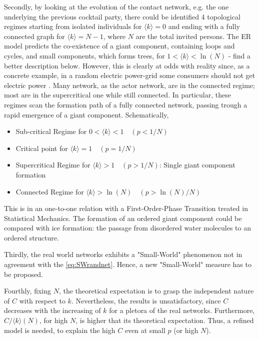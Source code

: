 \documentclass[a4paper,12pt,twoside]{book} %
\theoremstyle{definition}
\begin{document}
Secondly, by looking at the evolution of the contact network, e.g. the one underlying the previous cocktail party, there could be identified 4 topological regimes starting from isolated individuals for $\langle k \rangle = 0$ and ending with a fully connected graph for $\langle k \rangle = N-1$, where $N$ are the total invited persons. The ER model predicts the co-existence of a giant component, containing loops and cycles, and small components, which forms trees, for $1 < \langle k\rangle < \ln(N)$ - find a better description below. However, this is clearly at odds with reality since, as a concrete example, in a random electric power-grid some consumers should not get electric power \cite{barabasi::2016networkbook}. Many network, as the actor network, are in the connected regime; most are in the supercritical one while still connected.
In particular, these regimes scan the formation path of a fully connected network, passing trough a rapid emergence of a giant component.
\newline Schematically,
\begin{itemize}[noitemsep]
	\item Sub-critical Regime for $0 < \langle k \rangle < 1 \quad (p < 1/N)$ 
	\item Critical point for $\langle k \rangle = 1 \quad (p = 1/N)$
	\item Supercritical Regime for $\langle k \rangle > 1 \quad (p > 1/N)$: Single giant component formation
	\item Connected Regime for $\langle k \rangle > \ln(N) \quad (p > \ln(N)/N)$
\end{itemize}
This is in an one-to-one relation with a First-Order-Phase Transition treated in Statistical Mechanics. The formation of an ordered giant component could be compared with ice formation: the passage from disordered water molecules to an ordered structure.

Thirdly, the real world networks exhibits a "Small-World" phenomenon not in agreement with the \autoref{eq:SWrandnet}. Hence, a new "Small-World" measure has to be proposed.

Fourthly, fixing $N$, the theoretical expectation is to grasp the independent nature of $C$ with respect to $k$. Nevertheless, the results is unsatisfactory, since $C$ decreases with the increasing of $k$ for a pletora of the real networks.
Furthermore, $C/\langle k \rangle (N)$, for high $N$, is higher that its theoretical expectation. Thus, a refined model is needed, to explain the high $C$ even at small $p$ (or high $N$).
\end{document}
